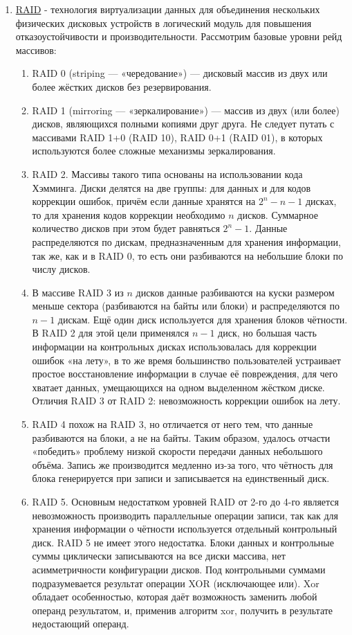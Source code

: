 \begin{enumerate}
     \item \underline{RAID} - технология виртуализации данных для объединения нескольких физических дисковых устройств в логический модуль для повышения отказоустойчивости и производительности.
     Рассмотрим базовые уровни рейд массивов:
     \begin{enumerate}
         \item RAID 0 (striping — «чередование») — дисковый массив из двух или более жёстких дисков без резервирования.
         \item RAID 1 (mirroring — «зеркалирование») — массив из двух (или более) дисков, являющихся полными копиями друг друга. Не следует путать с массивами RAID 1+0 (RAID 10), RAID 0+1 (RAID 01), в которых используются более сложные механизмы зеркалирования.
         \item RAID 2. Массивы такого типа основаны на использовании кода Хэмминга. Диски делятся на две группы: для данных и для кодов коррекции ошибок, причём если данные хранятся на $2 ^ n - n - 1$ дисках, то для хранения кодов коррекции необходимо $n$ дисков. Суммарное количество дисков при этом будет равняться $2 ^ n - 1$. Данные распределяются по дискам, предназначенным для хранения информации, так же, как и в RAID 0, то есть они разбиваются на небольшие блоки по числу дисков. 
         \item В массиве RAID 3 из $n$ дисков данные разбиваются на куски размером меньше сектора (разбиваются на байты или блоки) и распределяются по $n - 1$ дискам. Ещё один диск используется для хранения блоков чётности. В RAID 2 для этой цели применялся $n - 1$ диск, но большая часть информации на контрольных дисках использовалась для коррекции ошибок «на лету», в то же время большинство пользователей устраивает простое восстановление информации в случае её повреждения, для чего хватает данных, умещающихся на одном выделенном жёстком диске. \\ Отличия RAID 3 от RAID 2: невозможность коррекции ошибок на лету.
         \item RAID 4 похож на RAID 3, но отличается от него тем, что данные разбиваются на блоки, а не на байты. Таким образом, удалось отчасти «победить» проблему низкой скорости передачи данных небольшого объёма. Запись же производится медленно из-за того, что чётность для блока генерируется при записи и записывается на единственный диск.
         \item RAID 5. Основным недостатком уровней RAID от 2-го до 4-го является невозможность производить параллельные операции записи, так как для хранения информации о чётности используется отдельный контрольный диск. RAID 5 не имеет этого недостатка. Блоки данных и контрольные суммы циклически записываются на все диски массива, нет асимметричности конфигурации дисков. Под контрольными суммами подразумевается результат операции XOR (исключающее или). Xor обладает особенностью, которая даёт возможность заменить любой операнд результатом, и, применив алгоритм xor, получить в результате недостающий операнд.

\end{enumerate}
\end{enumerate}
